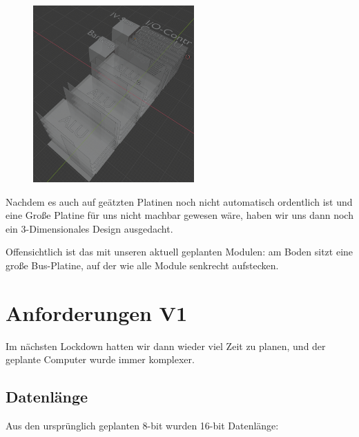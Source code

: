 \documentclass{scrartcl}
\begin{document}
        \begin{figure}
        \vspace{-40pt}
        \begin{center}
        \includegraphics[width=0.55\textwidth]{3D_Desighn_V2}
        \end{center}
        \vspace{-50pt}
        \end{figure}

    Nachdem es auch auf geätzten Platinen noch nicht automatisch ordentlich ist und eine Große Platine für uns nicht machbar gewesen wäre, haben wir uns dann noch ein 3-Dimensionales Design ausgedacht.


    Offensichtlich ist das mit unseren aktuell geplanten Modulen: am Boden sitzt eine große Bus-Platine, auf der wie alle Module senkrecht aufstecken.
        \newline
        \newline
        \newline

    \newpage
    \section{Anforderungen V1}
    Im nächsten Lockdown hatten wir dann wieder viel Zeit zu planen, und der geplante Computer wurde immer komplexer.

    \subsection{Datenlänge}

    Aus den ursprünglich geplanten 8-bit wurden 16-bit Datenlänge:
\end{document}
